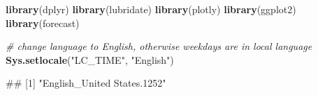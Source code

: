 \documentclass[
  a4paperpaper,
]{book}
\newenvironment{Shaded}{\begin{snugshade}}{\end{snugshade}}
\newcommand{\CommentTok}[1]{\textcolor[rgb]{0.56,0.35,0.01}{\textit{#1}}}
\newcommand{\KeywordTok}[1]{\textcolor[rgb]{0.13,0.29,0.53}{\textbf{#1}}}
\newcommand{\NormalTok}[1]{#1}
\newcommand{\StringTok}[1]{\textcolor[rgb]{0.31,0.60,0.02}{#1}}
\let\oldShaded\Shaded
\let\endoldShaded\endShaded
\renewenvironment{Shaded}{\footnotesize\oldShaded}{\endoldShaded}
\let\oldverbatim\verbatim
\let\endoldverbatim\endverbatim
\renewenvironment{verbatim}{\footnotesize\oldverbatim}{\endoldverbatim}
\begin{document}
\begin{Shaded}
\begin{Highlighting}[]
\KeywordTok{library}\NormalTok{(dplyr)}
\KeywordTok{library}\NormalTok{(lubridate)}
\KeywordTok{library}\NormalTok{(plotly)}
\KeywordTok{library}\NormalTok{(ggplot2)}
\KeywordTok{library}\NormalTok{(forecast)}

\CommentTok{# change language to English, otherwise weekdays are in local language}
\KeywordTok{Sys.setlocale}\NormalTok{(}\StringTok{"LC_TIME"}\NormalTok{, }\StringTok{"English"}\NormalTok{)}
\end{Highlighting}
\end{Shaded}

\begin{verbatim}
## [1] "English_United States.1252"
\end{verbatim}
\end{document}
